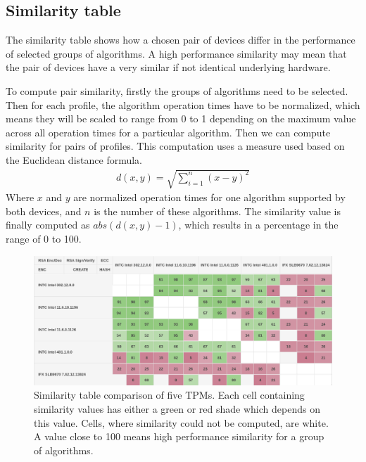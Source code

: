 \subsection{Similarity table}
The similarity table shows how a chosen pair of devices differ in the performance of selected groups of algorithms. A high performance similarity may mean that the pair of devices have a very similar if not identical underlying hardware.

To compute pair similarity, firstly the groups of algorithms need to be selected. Then for each profile, the algorithm operation times have to be normalized, which means they will be scaled to range from 0 to 1 depending on the maximum value across all operation times for a particular algorithm. Then we can compute similarity for pairs of profiles. This computation uses a measure used based on the Euclidean distance formula.
\begin{align*}
    d(x, y) = \sqrt{\sum_{i=1}^{n}(x - y)^{2}} 
\end{align*}
Where $x$ and $y$ are normalized operation times for one algorithm supported by both devices, and $n$ is the number of these algorithms. The similarity value is finally computed as $abs(d(x, y) - 1)$, which results in a percentage in the range of 0 to 100.
\begin{figure}[!tbp]
    \centering
    \includegraphics[width=\textwidth-0.54cm]{img/visualizations/tpm-similarity-intext.png}
    \caption{Similarity table comparison of five TPMs. Each cell containing similarity values has either a green or red shade which depends on this value. Cells, where similarity could not be computed, are white. A value close to 100 means high performance similarity for a group of algorithms.}
    \label{fig:simtable-intext}
\end{figure}

